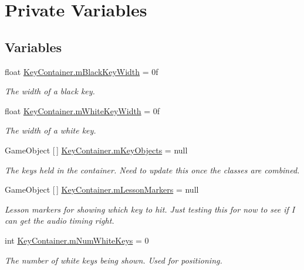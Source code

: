 \hypertarget{group___key_contain_priv_var}{}\section{Private Variables}
\label{group___key_contain_priv_var}
\subsection*{Variables}
\begin{DoxyCompactItemize}
\item 
float \hyperlink{group___key_contain_priv_var_ga6461d765c3904e6a3031558d7385be25}{Key\+Container.\+m\+Black\+Key\+Width} = 0f
\begin{DoxyCompactList}\small\item\em The width of a black key. \end{DoxyCompactList}\item 
float \hyperlink{group___key_contain_priv_var_gae5b8787a5242834f99ad8072e7ea6004}{Key\+Container.\+m\+White\+Key\+Width} = 0f
\begin{DoxyCompactList}\small\item\em The width of a white key. \end{DoxyCompactList}\item 
Game\+Object \mbox{[}$\,$\mbox{]} \hyperlink{group___key_contain_priv_var_ga01addf187bb12ffe824374df98e2c2d8}{Key\+Container.\+m\+Key\+Objects} = null
\begin{DoxyCompactList}\small\item\em The keys held in the container. Need to update this once the classes are combined. \end{DoxyCompactList}\item 
Game\+Object \mbox{[}$\,$\mbox{]} \hyperlink{group___key_contain_priv_var_gaf21490115ecf2b80c1bd382d7469a08c}{Key\+Container.\+m\+Lesson\+Markers} = null
\begin{DoxyCompactList}\small\item\em Lesson markers for showing which key to hit. Just testing this for now to see if I can get the audio timing right. \end{DoxyCompactList}\item 
int \hyperlink{group___key_contain_priv_var_ga7a5547a1fe5c40eac487fe6c826c8f9c}{Key\+Container.\+m\+Num\+White\+Keys} = 0
\begin{DoxyCompactList}\small\item\em The number of white keys being shown. Used for positioning. \end{DoxyCompactList}\item 

\end{DoxyCompactItemize}

